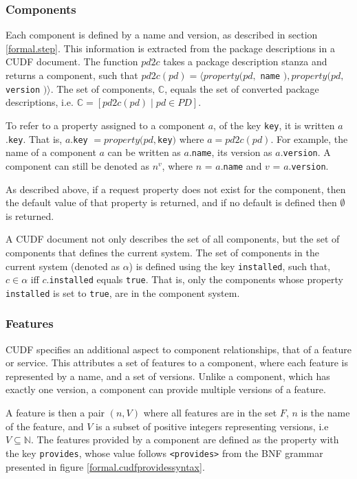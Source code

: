 \subsubsection{Components}
Each component is defined by a name and version, as described in section \ref{formal.step}.
This information is extracted from the package descriptions in a CUDF document.
The function $pd2c$ takes a package description stanza and returns a component, such that $pd2c(pd) = \langle property(pd, $ \verb+name+ $), property(pd, $ \verb+version+ $) \rangle$.
The set of components, $\mathbb{C}$, equals the set of converted package descriptions, i.e. $\mathbb{C} = [ pd2c(pd) \mid pd \in PD]$.

To refer to a property assigned to a component $a$, of the key \verb+key+, it is written $a$.\verb+key+.
That is, $a$.\verb+key+ $= property(pd, $\verb+key+$)$ where $a = pd2c(pd)$.
For example, the name of a component $a$ can be written as $a$.\verb+name+, its version as $a$.\verb+version+.
A component can still be denoted as $n^v$, where $n$ = $a$.\verb+name+ and $v$ = $a$.\verb+version+.

As described above, 
if a request property does not exist for the component, then the default value of that property is returned, and if no default is defined then $\emptyset$ is returned.

A CUDF document not only describes the set of all components, but the set of components that defines the current system.
The set of components in the current system (denoted as $\alpha$) is defined using the key \verb+installed+,
such that, $c \in \alpha$ iff  $c.$\verb+installed+ equals \verb+true+.
That is, only the components whose property \verb+installed+ is set to \verb+true+, are in the component system.

\subsubsection{Features}
CUDF specifies an additional aspect to component relationships, that of a feature or service.
This attributes a set of features to a component, where each feature is represented by a name, and a set of versions.
Unlike a component, which has exactly one version, a component can provide multiple versions of a feature.

A feature is then a pair $(n,V)$ where all features are in the set $F$, $n$ is the name of the feature, and $V$ is a subset of positive integers representing versions, i.e $V \subseteq \mathbb{N}$.
The features provided by a component are defined as the property with the key \verb+provides+, 
whose value follows \verb+<provides>+ from the BNF grammar presented in figure \ref{formal.cudfprovidessyntax}.

